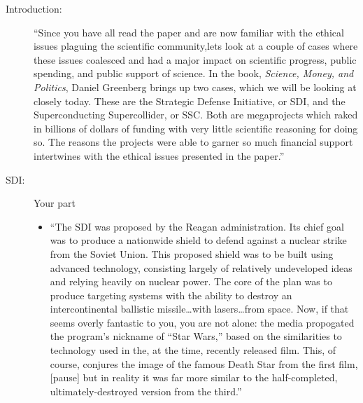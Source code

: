 \documentclass[12pt]{article}
\begin{document}
\thispagestyle{fancy}
\vspace*{0.25in}


\begin{description}

  \item[Introduction:] ``Since you have all read the paper and are now familiar
    with the ethical issues plaguing the scientific community,lets look at a
    couple of cases where these issues coalesced and had a major impact on
    scientific progress, public spending, and public support of science. In the
    book, \emph{Science, Money, and Politics}, Daniel Greenberg brings up two
    cases, which we will be looking at closely today. These are the Strategic
    Defense Initiative, or SDI, and the Superconducting Supercollider, or SSC.
    Both are megaprojects which raked in billions of dollars of funding with
    very little scientific reasoning for doing so. The reasons the projects
    were able to garner so much financial support intertwines with the ethical
    issues presented in the paper.''

  \item[SDI:] Your part
    \begin{itemize}

      \item``The SDI was proposed by the Reagan administration. Its chief
        goal was to produce a nationwide shield to defend against a nuclear strike
        from the Soviet Union. This proposed shield was to be built using advanced
        technology, consisting largely of relatively undeveloped ideas and relying
        heavily on nuclear power. The core of the plan was to produce targeting
        systems with the ability to destroy an intercontinental ballistic
        missile\ldots with lasers\ldots from space. Now, if that seems overly
        fantastic to you, you are not alone: the media propogated the program's
        nickname of ``Star Wars,'' based on the similarities to technology used in
        the, at the time, recently released film. This, of course, conjures the
        image of the famous Death Star from the first film, [pause] but in reality
        it was far more similar to the half-completed, ultimately-destroyed version
        from the third.''


\end{itemize}
\end{description}
\end{document}
